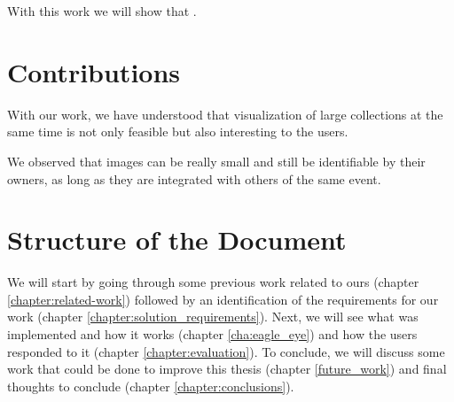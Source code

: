 With this work we will show that .




\section{Contributions} %
\label{sec:contributions}

With our work, we have understood that visualization of large collections at the same time is not only feasible but also interesting to the users. 

We observed that images can be really small and still be identifiable by their owners, as long as they are integrated with others of the same event.




\section{Structure of the Document} %
\label{ssub:structure_of_the_document}

We will start by going through some previous work related to ours (chapter \ref{chapter:related-work}) followed by an identification of the requirements for our work (chapter \ref{chapter:solution_requirements}). Next, we will see what was implemented and how it works (chapter \ref{cha:eagle_eye}) and how the users responded to it (chapter \ref{chapter:evaluation}). To conclude, we will discuss some work that could be done to improve this thesis (chapter \ref{future_work}) and final thoughts to conclude (chapter \ref{chapter:conclusions}).


